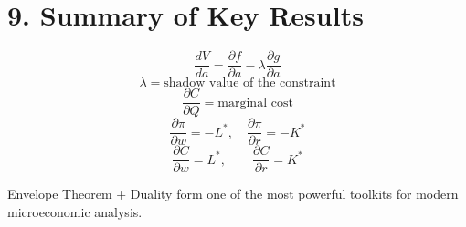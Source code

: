 \documentclass[12pt]{article}
\begin{document}
\section*{9. Summary of Key Results}

\begin{tcolorbox}
\[
\frac{dV}{da} = \frac{\partial f}{\partial a} 
- \lambda\frac{\partial g}{\partial a}
\]
\[
\lambda = \text{shadow value of the constraint}
\]
\[
\frac{\partial C}{\partial Q}=\text{marginal cost}
\]
\[
\frac{\partial \pi}{\partial w}=-L^*, \quad 
\frac{\partial \pi}{\partial r}=-K^*
\]
\[
\frac{\partial C}{\partial w}=L^*, \qquad \frac{\partial C}{\partial r}=K^*
\]
\end{tcolorbox}

Envelope Theorem + Duality form one of the most powerful toolkits for modern microeconomic analysis.
\end{document}
